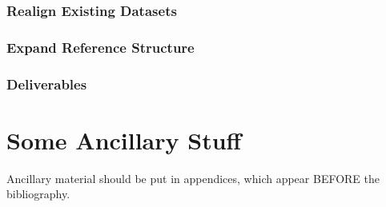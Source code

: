 \documentclass[11pt,proposal]{ucthesis}
\begin{document}
\subsection{Realign Existing Datasets}

\subsection{Expand Reference Structure}

\subsection{Deliverables}




    

\appendix
\chapter{Some Ancillary Stuff}

Ancillary material should be put in appendices, which appear BEFORE the
bibliography. 


\nocite{*}

\def\baselinestretch{1.0}\large\normalsize



\end{document}
